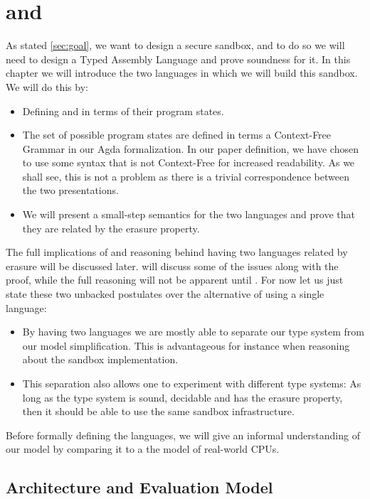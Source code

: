 \chapter{\ATAL and \ATALe}
\label{chap:lang}

As stated \cref{sec:goal}, we want to design a secure sandbox, and to do so we
will need to design a Typed Assembly Language and prove soundness for it. In
this chapter we will introduce the two languages in which we will build this
sandbox. We will do this by:

\begin{itemize}
\item Defining \ATAL and \ATALe in terms of their program states.
\item The set of possible program states are defined in terms a Context-Free
  Grammar in our Agda formalization. In our paper definition, we have chosen to
  use some syntax that is not Context-Free for increased readability. As we
  shall see, this is not a problem as there is a trivial correspondence between
  the two presentations.
\item We will present a small-step semantics for the two languages and prove
  that they are related by the erasure property.
\end{itemize}

The full implications of and reasoning behind having two languages related by
erasure will be discussed later.  will discuss some of the
issues along with the proof, while the full reasoning will not be apparent until
. For now let us just state these two unbacked postulates
over the alternative of using a single language:

\begin{itemize}
\item By having two languages we are mostly able to separate our type system
  from our model simplification. This is advantageous for instance when
  reasoning about the sandbox implementation.
\item This separation also allows one to experiment with different type systems:
  As long as the type system is sound, decidable and has the erasure property,
  then it should be able to use the same sandbox infrastructure.
\end{itemize}

Before formally defining the languages, we will give an informal understanding
of our model by comparing it to a the model of real-world CPUs.

\section{Architecture and Evaluation Model}

